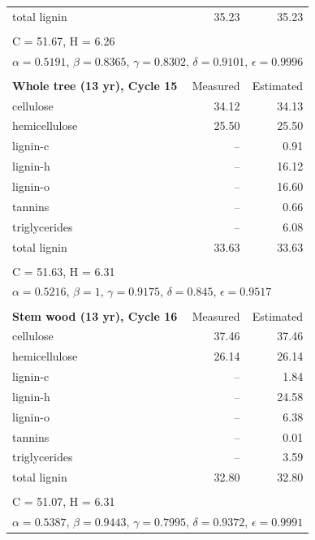 \begin{longtable}{p{8cm}rr}
    total lignin  & 35.23 & 35.23 \\
    \\
    \multicolumn{3}{l}{C = 51.67, H = 6.26} \\
    \multicolumn{3}{l}{$\alpha = 0.5191$, $\beta = 0.8365$, $\gamma = 0.8302$, $\delta = 0.9101$, $\epsilon = 0.9996$} \\
    \\
    \textbf{Whole tree (13 yr), Cycle 15} & Measured & Estimated \\
    \midrule
    cellulose     & 34.12 & 34.13 \\
    hemicellulose & 25.50 & 25.50 \\
    lignin-c      & --    & 0.91 \\
    lignin-h      & --    & 16.12 \\
    lignin-o      & --    & 16.60 \\
    tannins       & --    & 0.66 \\
    triglycerides & --    & 6.08 \\
    total lignin  & 33.63 & 33.63 \\
    \\
    \multicolumn{3}{l}{C = 51.63, H = 6.31} \\
    \multicolumn{3}{l}{$\alpha = 0.5216$, $\beta = 1$, $\gamma = 0.9175$, $\delta = 0.845$, $\epsilon = 0.9517$} \\
    \\
    \textbf{Stem wood (13 yr), Cycle 16} & Measured & Estimated \\
    \midrule
    cellulose     & 37.46 & 37.46 \\
    hemicellulose & 26.14 & 26.14 \\
    lignin-c      & --    & 1.84 \\
    lignin-h      & --    & 24.58 \\
    lignin-o      & --    & 6.38 \\
    tannins       & --    & 0.01 \\
    triglycerides & --    & 3.59 \\
    total lignin  & 32.80 & 32.80 \\
    \\
    \multicolumn{3}{l}{C = 51.07, H = 6.31} \\
    \multicolumn{3}{l}{$\alpha = 0.5387$, $\beta = 0.9443$, $\gamma = 0.7995$, $\delta = 0.9372$, $\epsilon = 0.9991$} \\
\end{longtable}

